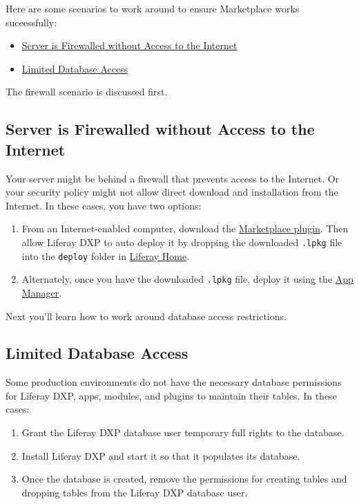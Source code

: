 Here are some scenarios to work around to ensure Marketplace works
successfully:

\begin{itemize}
\tightlist
\item
  \hyperref[server-is-firewalled-without-access-to-the-internet]{Server
  is Firewalled without Access to the Internet}
\item
  \hyperref[limited-database-access]{Limited Database Access}
\end{itemize}

The firewall scenario is discussed first.

\subsection{Server is Firewalled without Access to the
Internet}\label{server-is-firewalled-without-access-to-the-internet}

Your server might be behind a firewall that prevents access to the
Internet. Or your security policy might not allow direct download and
installation from the Internet. In these cases, you have two options:

\begin{enumerate}
\def\labelenumi{\arabic{enumi}.}
\item
  From an Internet-enabled computer, download the
  \href{https://www.liferay.com/marketplace/download}{Marketplace
  plugin}. Then allow Liferay DXP to auto deploy it by dropping the
  downloaded \texttt{.lpkg} file into the \texttt{deploy} folder in
  \href{/docs/7-1/deploy/-/knowledge_base/d/installing-liferay\#liferay-home}{Liferay
  Home}.
\item
  Alternately, once you have the downloaded \texttt{.lpkg} file, deploy
  it using the
  \href{/docs/7-1/user/-/knowledge_base/u/managing-and-configuring-apps}{App
  Manager}.
\end{enumerate}

Next you'll learn how to work around database access restrictions.

\subsection{Limited Database Access}\label{limited-database-access}

Some production environments do not have the necessary database
permissions for Liferay DXP, apps, modules, and plugins to maintain
their tables. In these cases:

\begin{enumerate}
\def\labelenumi{\arabic{enumi}.}
\item
  Grant the Liferay DXP database user temporary full rights to the
  database.
\item
  Install Liferay DXP and start it so that it populates its database.
\item
  Once the database is created, remove the permissions for creating
  tables and dropping tables from the Liferay DXP database user.
\end{enumerate}

